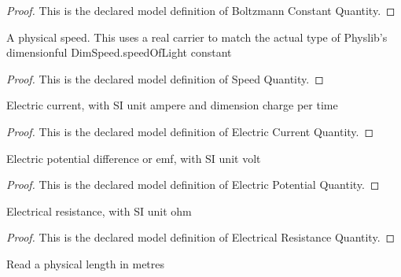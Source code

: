 \begin{proof}
  This is the declared model definition of Boltzmann Constant Quantity.
\end{proof}
\begin{definition}
  \label{def:physics:phyx-mini-0614:phyxminiproblems-problemphyxmini0614-speedquantity}
  A physical speed. This uses a real carrier to match the actual type of Physlib's dimensionful DimSpeed.speedOfLight constant
\end{definition}
\begin{proof}
  This is the declared model definition of Speed Quantity.
\end{proof}
\begin{definition}
  \label{def:physics:phyx-mini-0614:phyxminiproblems-problemphyxmini0614-electriccurrentquantity}
  Electric current, with SI unit ampere and dimension charge per time
\end{definition}
\begin{proof}
  This is the declared model definition of Electric Current Quantity.
\end{proof}
\begin{definition}
  \label{def:physics:phyx-mini-0614:phyxminiproblems-problemphyxmini0614-electricpotentialquantity}
  Electric potential difference or emf, with SI unit volt
\end{definition}
\begin{proof}
  This is the declared model definition of Electric Potential Quantity.
\end{proof}
\begin{definition}
  \label{def:physics:phyx-mini-0614:phyxminiproblems-problemphyxmini0614-electricalresistancequantity}
  Electrical resistance, with SI unit ohm
\end{definition}
\begin{proof}
  This is the declared model definition of Electrical Resistance Quantity.
\end{proof}
\begin{definition}
  \label{def:physics:phyx-mini-0614:phyxminiproblems-problemphyxmini0614-lengthinmeters}
  Read a physical length in metres
\end{definition}

